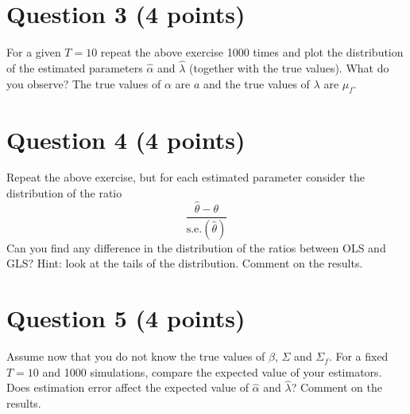 \documentclass[a4paper,12pt]{article}
\begin{document}
	\section*{Question 3 (4 points)}
	For a given $T=10$ repeat the above exercise 1000 times and plot the distribution of the estimated parameters $\hat{\alpha}$ and $\hat{\lambda}$ (together with the true values). What do you observe? The true values of $\alpha$ are $a$ and the true values of $\lambda$ are $\mu_f$.
	
	\section*{Question 4 (4 points)}
	Repeat the above exercise, but for each estimated parameter consider the distribution of the ratio
	\begin{equation*}
		\frac{\hat{\theta}-\theta}{\text{s.e.}(\hat{\theta})}
	\end{equation*}
	Can you find any difference in the distribution of the ratios between OLS and GLS? Hint: look at the tails of the distribution. Comment on the results.
	
	\section*{Question 5 (4 points)}
	Assume now that you do not know the true values of $\beta$, $\Sigma$ and $\Sigma_f$. For a fixed $T=10$ and 1000 simulations, compare the expected value of your estimators. Does estimation error affect the expected value of $\hat{\alpha}$ and $\hat{\lambda}$? Comment on the results.
	
\end{document}
